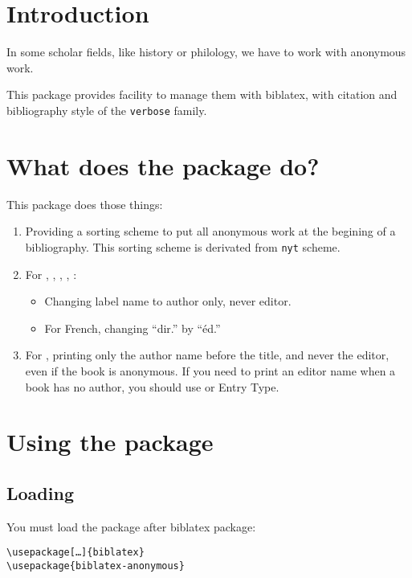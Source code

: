 \documentclass{ltxdockit}[2011/03/25]
\newcommand{\biblatex}{biblatex\xspace}
\newcommand{\namebibstyle}[1]{\texttt{#1}}
\begin{document}
\printtitlepage
\tableofcontents

\section{Introduction}

In some scholar fields, like history or philology, we have to work with anonymous work. 

This package provides facility to manage them with \biblatex, with citation and bibliography style of the \namebibstyle{verbose} family.

\section{What does the package do?}

This package does those things:

\begin{enumerate}
	\item Providing a sorting scheme to put all anonymous work at the begining of a bibliography. This sorting scheme is derivated from \verb+nyt+ scheme.
	\item For , , , , :
		\begin{itemize}
			\item Changing label name to author only, never editor.
			\item For French, changing \enquote{dir.} by \enquote{éd.}
	\end{itemize}
	\item For , printing only the author name  before the title, and never the editor, even if the book is anonymous. If you need to print an editor name when a book has no author, you should use  or  Entry Type.
		
\end{enumerate}

\section{Using the package}

\subsection{Loading}
You must load the package after \biblatex package:
\begin{verbatim}
\usepackage[…]{biblatex}
\usepackage{biblatex-anonymous}
\end{verbatim}
\end{document}

